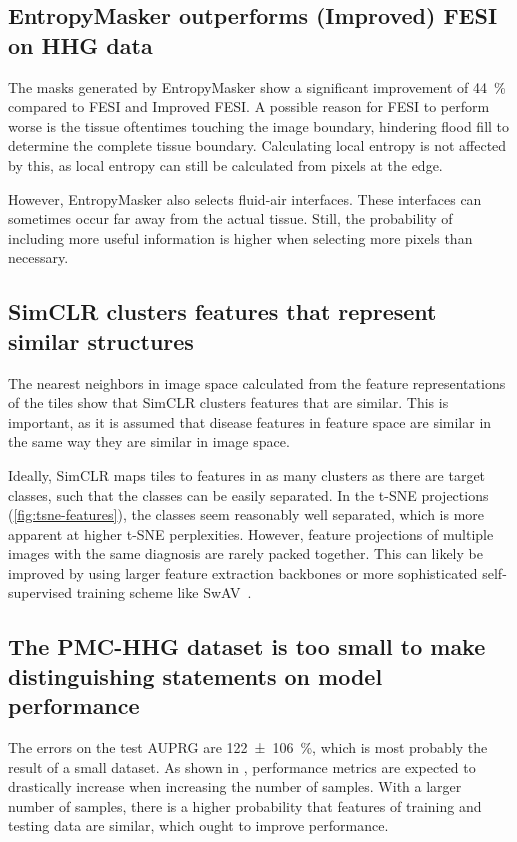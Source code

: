 \subsection{EntropyMasker outperforms (Improved) FESI on HHG data}
The masks generated by EntropyMasker show a significant improvement of \qty{44}{\percent} compared to FESI and Improved FESI.
A possible reason for FESI to perform worse is the tissue oftentimes touching the image boundary, hindering flood fill to determine the complete tissue boundary.
Calculating local entropy is not affected by this, as local entropy can still be calculated from pixels at the edge.

However, EntropyMasker also selects fluid-air interfaces.
These interfaces can sometimes occur far away from the actual tissue.
Still, the probability of including more useful information is higher when selecting more pixels than necessary.

\subsection{SimCLR clusters features that represent similar structures}
The nearest neighbors in image space calculated from the feature representations of the tiles show that SimCLR clusters features that are similar.
This is important, as it is assumed that disease features in feature space are similar in the same way they are similar in image space.

Ideally, SimCLR maps tiles to features in as many clusters as there are target classes, such that the classes can be easily separated.
In the t-SNE projections (\cref{fig:tsne-features}), the classes seem reasonably well separated, which is more apparent at higher t-SNE perplexities.
However, feature projections of multiple images with the same diagnosis are rarely packed together.
This can likely be improved by using larger feature extraction backbones or more sophisticated self-supervised training scheme like SwAV~.

\subsection{The PMC-HHG dataset is too small to make distinguishing statements on model performance}
The errors on the test AUPRG are \qty{122 \pm 106}{\percent}, which is most probably the result of a small dataset.
As shown in , performance metrics are expected to drastically increase when increasing the number of samples.
With a larger number of samples, there is a higher probability that features of training and testing data are similar, which ought to improve performance.

